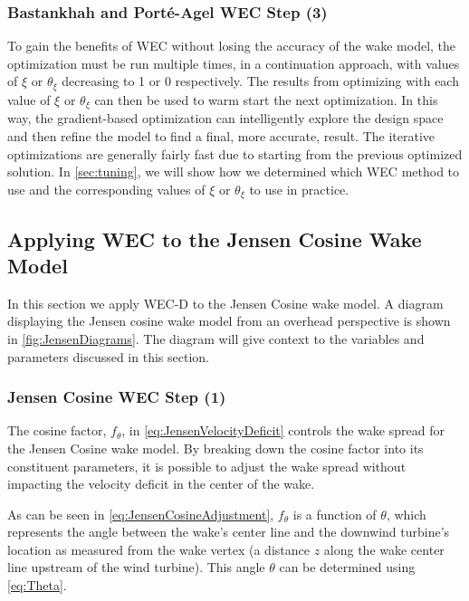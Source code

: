 \documentclass{jpconf}
\begin{document}
\subsubsection{Bastankhah and Port\'e-Agel WEC Step (3)}
To gain the benefits of WEC without losing the accuracy of the wake model, the optimization must be run multiple times, in a continuation approach, with values of $\xi$ or $\theta_\xi$ decreasing to 1 or 0 respectively. The results from optimizing with each value of $\xi$ or $\theta_\xi$ can then be used to warm start the next optimization. In this way, the gradient-based optimization can intelligently explore the design space and then refine the model to find a final, more accurate, result. The iterative optimizations are generally fairly fast due to starting from the previous optimized solution. In \cref{sec:tuning}, we will show how we determined which WEC method to use and the corresponding values of $\xi$ or $\theta_\xi$ to use in practice.

\subsection{Applying WEC to the Jensen Cosine Wake Model}
In this section we apply WEC-D to the Jensen Cosine wake model. A diagram displaying the Jensen cosine wake model from an overhead perspective is shown in \cref{fig:JensenDiagrams}. The diagram will give context to the variables and parameters discussed in this section.

\subsubsection{Jensen Cosine WEC Step (1)} 

The cosine factor, $f_\theta$, in \cref{eq:JensenVelocityDeficit} controls the wake spread for the Jensen Cosine wake model. By breaking down the cosine factor into its constituent parameters, it is possible to adjust the wake spread without impacting the velocity deficit in the center of the wake.

As can be seen in \cref{eq:JensenCosineAdjustment}, $f_\theta$ is a function of $\theta$, which represents the angle between the wake's center line and the downwind turbine's location as measured from the wake vertex (a distance $z$ along the wake center line upstream of the wind turbine). This angle $\theta$ can be determined using \cref{eq:Theta}.
\end{document}
